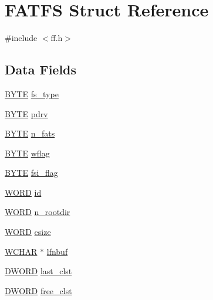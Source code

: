 \hypertarget{structFATFS}{}\section{F\+A\+T\+FS Struct Reference}
\label{structFATFS}


{\ttfamily \#include $<$ff.\+h$>$}

\subsection*{Data Fields}
\begin{DoxyCompactItemize}
\item 
\hyperlink{ff_8h_a4ae1dab0fb4b072a66584546209e7d58}{B\+Y\+TE} \hyperlink{structFATFS_add27d97babe807b573eac98a71dc4ae5}{fs\+\_\+type}
\item 
\hyperlink{ff_8h_a4ae1dab0fb4b072a66584546209e7d58}{B\+Y\+TE} \hyperlink{structFATFS_acae426c920cd7f59e5883f948e1b3184}{pdrv}
\item 
\hyperlink{ff_8h_a4ae1dab0fb4b072a66584546209e7d58}{B\+Y\+TE} \hyperlink{structFATFS_a56716c7e7ac10cf46e73ffb2a2e9b545}{n\+\_\+fats}
\item 
\hyperlink{ff_8h_a4ae1dab0fb4b072a66584546209e7d58}{B\+Y\+TE} \hyperlink{structFATFS_a647e43c9ccae94b7274793d1909897de}{wflag}
\item 
\hyperlink{ff_8h_a4ae1dab0fb4b072a66584546209e7d58}{B\+Y\+TE} \hyperlink{structFATFS_a84e9cdc5a6a8e33ea7ec192058abf161}{fsi\+\_\+flag}
\item 
\hyperlink{ff_8h_a197942eefa7db30960ae396d68339b97}{W\+O\+RD} \hyperlink{structFATFS_a417095d7c20d56d417dc0998e0dd5a5c}{id}
\item 
\hyperlink{ff_8h_a197942eefa7db30960ae396d68339b97}{W\+O\+RD} \hyperlink{structFATFS_a189a00aa038044ffad0fc7f7dcf2aae1}{n\+\_\+rootdir}
\item 
\hyperlink{ff_8h_a197942eefa7db30960ae396d68339b97}{W\+O\+RD} \hyperlink{structFATFS_ad7fa7a509f8d097a9ab182d6c47be568}{csize}
\item 
\hyperlink{ff_8h_a0bb095da65fbe52192dd9e3e643c7568}{W\+C\+H\+AR} $\ast$ \hyperlink{structFATFS_ad1999aa771ae428c3abe14dbe585e981}{lfnbuf}
\item 
\hyperlink{ff_8h_ad342ac907eb044443153a22f964bf0af}{D\+W\+O\+RD} \hyperlink{structFATFS_ac26e848817569fedc15a9a4e49ddedd1}{last\+\_\+clst}
\item 
\hyperlink{ff_8h_ad342ac907eb044443153a22f964bf0af}{D\+W\+O\+RD} \hyperlink{structFATFS_ac834248773bf338df807f0d7e6b6a579}{free\+\_\+clst}

\end{DoxyCompactItemize}
